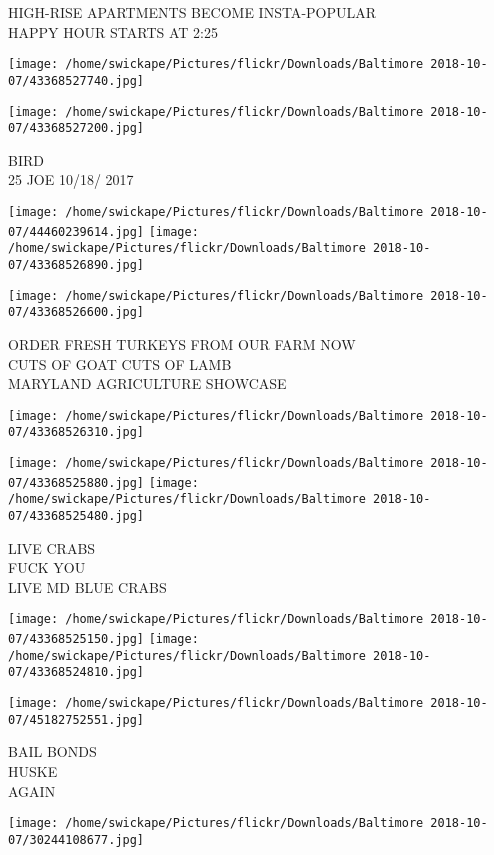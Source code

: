 \documentclass[10pt,letterpaper]{article}
\begin{document}
HIGH{-}RISE APARTMENTS BECOME INSTA{-}POPULAR\\
HAPPY HOUR STARTS AT 2:25
\pagebreak

\texttt{[image: /home/swickape/Pictures/flickr/Downloads/Baltimore 2018-10-07/43368527740.jpg]}

\vspace{0.25in}
\texttt{[image: /home/swickape/Pictures/flickr/Downloads/Baltimore 2018-10-07/43368527200.jpg]}

BIRD\\
25 JOE 10/18/ 2017
\pagebreak

\texttt{[image: /home/swickape/Pictures/flickr/Downloads/Baltimore 2018-10-07/44460239614.jpg]}
\texttt{[image: /home/swickape/Pictures/flickr/Downloads/Baltimore 2018-10-07/43368526890.jpg]}

\vspace{0.25in}
\texttt{[image: /home/swickape/Pictures/flickr/Downloads/Baltimore 2018-10-07/43368526600.jpg]}

ORDER FRESH TURKEYS FROM OUR FARM NOW\\
CUTS OF GOAT CUTS OF LAMB\\
MARYLAND AGRICULTURE SHOWCASE
\pagebreak

\texttt{[image: /home/swickape/Pictures/flickr/Downloads/Baltimore 2018-10-07/43368526310.jpg]}

\vspace{0.25in}
\texttt{[image: /home/swickape/Pictures/flickr/Downloads/Baltimore 2018-10-07/43368525880.jpg]}
\texttt{[image: /home/swickape/Pictures/flickr/Downloads/Baltimore 2018-10-07/43368525480.jpg]}

LIVE CRABS\\
FUCK YOU\\
LIVE MD BLUE CRABS
\pagebreak

\texttt{[image: /home/swickape/Pictures/flickr/Downloads/Baltimore 2018-10-07/43368525150.jpg]}
\texttt{[image: /home/swickape/Pictures/flickr/Downloads/Baltimore 2018-10-07/43368524810.jpg]}

\texttt{[image: /home/swickape/Pictures/flickr/Downloads/Baltimore 2018-10-07/45182752551.jpg]}

BAIL BONDS\\
HUSKE\\
AGAIN
\pagebreak

\texttt{[image: /home/swickape/Pictures/flickr/Downloads/Baltimore 2018-10-07/30244108677.jpg]}
\end{document}
